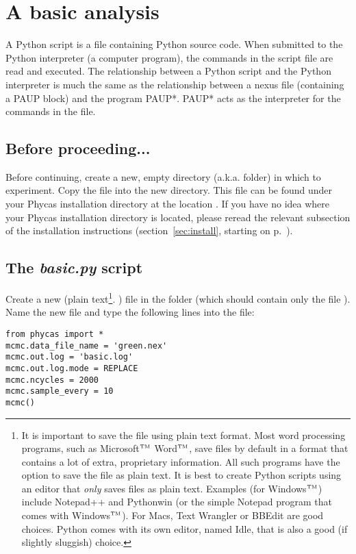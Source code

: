 \documentclass[10pt]{article}
\newcommand{\trademark}[1]{#1${}^{\mbox{\tiny TM}}$}
\begin{document}
\section{A basic analysis} \label{sec:basic}

A Python script is a file containing Python source code. When submitted to the Python interpreter (a computer program), the commands in the script file are read and executed. The relationship between a Python script and the Python interpreter is much the same as the relationship between a nexus file (containing a PAUP block) and the program PAUP*. PAUP* acts as the interpreter for the commands in the file. 

\subsection{Before proceeding...}

Before continuing, create a new, empty directory (a.k.a. folder) in which to experiment. Copy the file  into the new directory. This file can be found under your Phycas installation directory at the location . If you have no idea where your Phycas installation directory is located, please reread the relevant subsection of the installation instructions (section~\ref{sec:install}, starting on p.~\pageref{sec:install}).

\subsection{The {\em basic.py} script}

Create a new (plain text\footnote{
%
It is important to save the file using plain text format. Most word processing programs, such as \trademark{Microsoft} \trademark{Word}, save files by default in a format that contains a lot of extra, proprietary information. All such programs have the option to save the file as plain text. It is best to create Python scripts using an editor that {\em only} saves files as plain text. Examples (for \trademark{Windows}) include Notepad++ and Pythonwin (or the simple Notepad program that comes with \trademark{Windows}). For Macs, Text Wrangler or BBEdit are good choices. Python comes with its own editor, named Idle, that is also a good (if slightly sluggish) choice.}.
%
) file in the folder (which should contain only the file ). Name the new file  and type the following lines into the file:
\begin{verbatim}
from phycas import *
mcmc.data_file_name = 'green.nex'
mcmc.out.log = 'basic.log'
mcmc.out.log.mode = REPLACE
mcmc.ncycles = 2000
mcmc.sample_every = 10
mcmc()
\end{verbatim}
\end{document}
